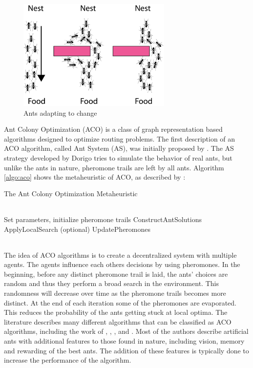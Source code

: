 \begin{figure}[H]
  \centering
  \includegraphics[width=3in]{assets/maur.png}
  \caption{Ants adapting to change}
   \label{fig:ants}
\end{figure}

Ant Colony Optimization (ACO) is a class of graph representation based algorithms designed to optimize routing problems. The first description of an ACO algorithm, called Ant System (AS), was initially proposed by \citet{dorigo96}. The AS strategy developed by Dorigo tries to simulate the behavior of real ants, but unlike the ants in nature, pheromone trails are left by all ants. Algorithm \ref{algo:aco} shows the metaheuristic of ACO, as described by \citet{dorigo06}: \\
\begin{algorithm}
\caption{The Ant Colony Optimization Metaheuristic}
\label{algo:aco}
\begin{algorithmic}
\\ Set parameters, initialize pheromone trails
    \State ConstructAntSolutions
    \State ApplyLocalSearch (optional)
    \State UpdatePheromones
  \EndWhile
\end{algorithmic}
\end{algorithm}
~\\
The idea of ACO algorithms is to create a decentralized system with multiple agents. The agents influence each others decisions by using pheromones. In the beginning, before any distinct pheromone trail is laid, the ants' choices are random and thus they perform a broad search in the environment. This randomness will decrease over time as the pheromone trails becomes more distinct. At the end of each iteration some of the pheromones are evaporated. This reduces the probability of the ants getting stuck at local optima. The literature describes many different algorithms that can be classified as ACO algorithms, including the work of \citet{salehi-nezhad07}, \citet{tripathi09}, \citet{jiang10}, and \citet{dias14}. Most of the authors describe artificial ants with additional features to those found in nature, including vision, memory and rewarding of the best ants. The addition of these features is typically done to increase the performance of the algorithm.

